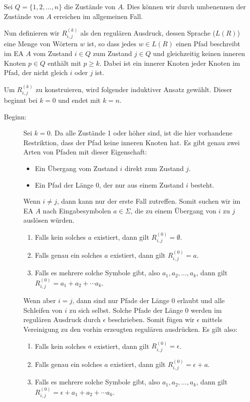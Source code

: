 Sei \(Q = \{1, 2, \ldots, n\}\) die Zustände von \(A\). Dies können wir durch umbenennen der Zustände von \(A\) erreichen im allgemeinen Fall.

Nun definieren wir \(R_{i, j}^{(k)}\) als den regulären Ausdruck, dessen Sprache (\(L(R)\)) eine Menge von Wörtern \(w\) ist, so dass jedes \(w \in L(R)\) einen Pfad beschreibt im EA \(A\) vom Zustand \(i \in Q\) zum Zustand \(j \in Q\) und gleichzeitig keinen inneren Knoten \(p \in Q\) enthält mit \(p \geq k\). Dabei ist ein innerer Knoten jeder Knoten im Pfad, der nicht gleich \(i\) oder \(j\) ist.

Um \(R_{i, j}^{(k)}\) zu konstruieren, wird folgender induktiver Ansatz gewählt. Dieser beginnt bei \(k = 0\) und endet mit \(k = n\).
\begin{description}
  \item[Beginn:] Sei \(k = 0\). Da alle Zustände 1 oder höher sind, ist die hier vorhandene Restriktion, dass der Pfad keine inneren Knoten hat. Es gibt genau zwei Arten von Pfaden mit dieser Eigenschaft:
  \begin{itemize}
    \item Ein Übergang vom Zustand \(i\) direkt zum Zustand \(j\).
    \item Ein Pfad der Länge 0, der nur aus einem Zustand \(i\) besteht.
  \end{itemize}
  Wenn \(i \neq j\), dann kann nur der erste Fall zutreffen. Somit suchen wir im EA \(A\) nach Eingabesymbolen \(a \in \Sigma\), die zu einem Übergang von \(i\) zu \(j\) auslösen würden.
  \begin{enumerate}
    \item Falls kein solches \(a\) existiert, dann gilt \(R_{i, j}^{(0)} = \emptyset\).
    \item Falls genau ein solches \(a\) existiert, dann gilt \(R_{i, j}^{(0)} = a\).
    \item Falls es mehrere solche Symbole gibt, also \(a_1, a_2, \ldots, a_k\), dann gilt \(R_{i, j}^{(0)} = a_1 + a_2 + \cdots a_k\).
  \end{enumerate}
  Wenn aber \(i = j\), dann sind nur Pfade der Länge 0 erlaubt und alle Schleifen von \(i\) zu sich selbst. Solche Pfade der Länge 0 werden im regulären Ausdruck durch \(\epsilon\) beschrieben. Somit fügen wir \(\epsilon\) mittels Vereinigung zu den vorhin erzeugten regulären ausdrücken. Es gilt also:
  \begin{enumerate}
    \item Falls kein solches \(a\) existiert, dann gilt \(R_{i, j}^{(0)} = \epsilon\).
    \item Falls genau ein solches \(a\) existiert, dann gilt \(R_{i, j}^{(0)} = \epsilon + a\).
    \item Falls es mehrere solche Symbole gibt, also \(a_1, a_2, \ldots, a_k\), dann gilt \(R_{i, j}^{(0)} = \epsilon + a_1 + a_2 + \cdots a_k\).
  \end{enumerate}
  

\end{description}
